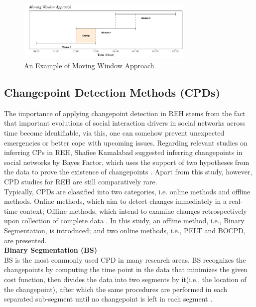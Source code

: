 \documentclass[]{interact}
\theoremstyle{plain}%
\theoremstyle{definition}
\theoremstyle{remark}
\begin{document}
\begin{figure}[h]
	\includegraphics[width=8.5cm]{MW}
	\centering
	\caption{An Example of Moving Window Approach}
	\label{Figure 1}
\end{figure}

\subsection{Changepoint Detection Methods (CPDs)}

\hspace{0.2cm} The importance of applying changepoint detection in REH stems from the fact that important evolutions of social interaction drivers in social networks across time become identifiable, via this, one can somehow prevent unexpected emergencies or better cope with upcoming issues. Regarding relevant studies on inferring CPs in REH, Shafiee Kamalabad suggested inferring changepoints in social networks by Bayes Factor, which uses the support of two hypotheses from the data to prove the existence of changepoints \cite{kamalabadWhatPointChange}. Apart from this study, however, CPD studies for REH are still comparatively rare. \\

Typically, CPDs are classified into two categories, i.e. online methods and offline methods. Online methods, which aim to detect changes immediately in a real-time context; Offline methods, which intend to examine changes retrospectively upon collection of complete data \cite{truongSelectiveReviewOffline2020}. In this study, an offline method, i.e., Binary Segmentation, is introduced; and two online methods, i.e., PELT and BOCPD, are presented. \\

\hspace{-0.55cm} \textbf{Binary Segmentation (BS)}\\

BS is the most commonly used CPD in many research areas. BS recognizes the changepoints by computing the time point in the data that minimizes the given cost function, then divides the data into two segments by it(i.e., the location of the changepoint), after which the same procedures are performed in each separated sub-segment until no changepoint is left in each segment \cite{killickOptimalDetectionChangepoints2012}. \\
\end{document}
